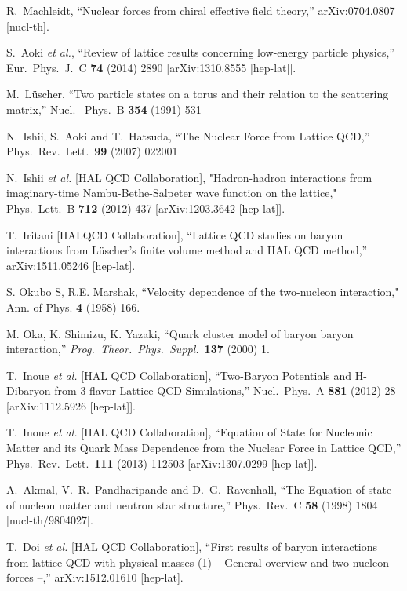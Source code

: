 \begin{thebibliography}{99.}
  R.~Machleidt,
  ``Nuclear forces from chiral effective field theory,''
  arXiv:0704.0807 [nucl-th].

  S.~Aoki {\it et al.},
  ``Review of lattice results concerning low-energy particle physics,''
  Eur.\ Phys.\ J.\ C {\bf 74} (2014) 2890
  [arXiv:1310.8555 [hep-lat]].

 M.~L\"{u}scher,
``Two particle states on a torus and their relation to the scattering matrix,''
Nucl. \ Phys.\ B {\bf 354} (1991) 531

N.~Ishii, S.~Aoki and T.~Hatsuda,
``The Nuclear Force from Lattice QCD,''
Phys.\ Rev.\ Lett.\  {\bf 99} (2007) 022001

  N.~Ishii {\it et al.} [HAL QCD Collaboration],
"Hadron-hadron interactions from imaginary-time Nambu-Bethe-Salpeter wave function on the lattice,"
 Phys.\ Lett.\ B {\bf 712} (2012) 437
[arXiv:1203.3642 [hep-lat]].

T.~Iritani [HALQCD Collaboration],
``Lattice QCD studies on baryon interactions from L\"uscher's finite volume method and HAL QCD method,''
arXiv:1511.05246 [hep-lat].

S. Okubo S, R.E. Marshak,
``Velocity dependence of the two-nucleon interaction,"
Ann. of Phys. {\bf 4} (1958) 166.

M. Oka, K. Shimizu, K. Yazaki, 
 ``Quark cluster model of baryon baryon interaction,''
 {\it Prog.\ Theor.\ Phys.\ Suppl.}\  {\bf 137}  (2000) 1.  

  T.~Inoue {\it et al.} [HAL QCD Collaboration],
  ``Two-Baryon Potentials and H-Dibaryon from 3-flavor Lattice QCD Simulations,''
  Nucl.\ Phys.\ A {\bf 881} (2012) 28
  [arXiv:1112.5926 [hep-lat]].
  
  T.~Inoue {\it et al.} [HAL QCD Collaboration],
  ``Equation of State for Nucleonic Matter and its Quark Mass Dependence from the Nuclear Force in Lattice QCD,''
  Phys.\ Rev.\ Lett.\  {\bf 111} (2013)  112503
  [arXiv:1307.0299 [hep-lat]].
  
  A.~Akmal, V.~R.~Pandharipande and D.~G.~Ravenhall,
  ``The Equation of state of nucleon matter and neutron star structure,''
  Phys.\ Rev.\ C {\bf 58} (1998) 1804
  [nucl-th/9804027]. 
  
  T.~Doi {\it et al.} [HAL QCD Collaboration],
  ``First results of baryon interactions from lattice QCD with physical masses (1) -- General overview and two-nucleon forces --,''
  arXiv:1512.01610 [hep-lat].
 


  
\end{thebibliography}
